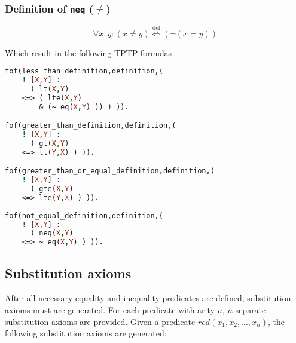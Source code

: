 \documentclass[magisterska,en]{pracamgr}
\newcommand{\code}[1]{\texttt{#1}}
\begin{document}
\subsubsection{Definition of \code{neq} ($\neq$)}
$$
\forall x, y : (x \neq y) \mathrel{\overset{\text{def}}{\iff}} (\neg (x=y))
$$

Which result in the following TPTP formulas

\begin{lstlisting}[language=Prolog, caption={TPTP definitions for \code{lt} ($<$), \code{gt} ($>$), \code{gte} ($\geq$), \code{neq} ($\neq$)}]
fof(less_than_definition,definition,(
    ! [X,Y] :
      ( lt(X,Y)
    <=> ( lte(X,Y)
        & (~ eq(X,Y) )) ) )).

fof(greater_than_definition,definition,(
    ! [X,Y] :
      ( gt(X,Y)
    <=> lt(Y,X) ) )).

fof(greater_than_or_equal_definition,definition,(
    ! [X,Y] :
      ( gte(X,Y)
    <=> lte(Y,X) ) )).
    
fof(not_equal_definition,definition,(
    ! [X,Y] :
      ( neq(X,Y)
    <=> ~ eq(X,Y) ) )).
\end{lstlisting}

\subsection{Substitution axioms}
After all necessary equality and inequality predicates are defined, substitution axioms must are generated. For each predicate with arity $n$, $n$ separate substitution axioms are provided. Given a predicate $red(x_1, x_2, \dots, x_n)$, the following substitution axioms are generated:
\end{document}
